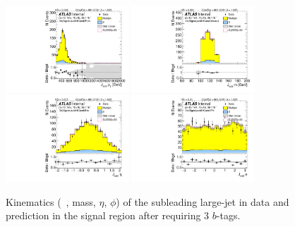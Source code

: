 \begin{figure}[htb!]
\begin{center}
\includegraphics[width=0.41\textwidth,angle=-90]{figures/boosted/Signal/b77_ThreeTag_Signal_sublHCand_Pt_m.pdf}
\includegraphics[width=0.41\textwidth,angle=-90]{figures/boosted/Signal/b77_ThreeTag_Signal_sublHCand_Mass_s.pdf}\\
\includegraphics[width=0.41\textwidth,angle=-90]{figures/boosted/Signal/b77_ThreeTag_Signal_sublHCand_Eta.pdf}
\includegraphics[width=0.41\textwidth,angle=-90]{figures/boosted/Signal/b77_ThreeTag_Signal_sublHCand_Phi.pdf}
  \caption{Kinematics (\pt~, mass, $\eta$, $\phi$) of the subleading large-\R jet in data and prediction in the signal region after requiring 3 $b$-tags. }
  \label{fig:boosted-3b-signal-ak10-subl}
\end{center}
\end{figure}

